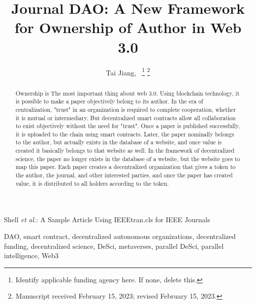 \documentclass[lettersize,journal]{IEEEtran}
\begin{document}
\title{Journal DAO: A New Framework for Ownership of Author in Web 3.0}

\author{Tai Jiang,~
\thanks{Identify applicable funding agency here. If none, delete this.}%
\thanks{Manuscript received February 15, 2023; revised February 15, 2023.}}

%
{Shell \MakeLowercase{\textit{et al.}}: A Sample Article Using IEEEtran.cls for IEEE Journals}


\maketitle

\begin{abstract}
Ownership is The most important thing about web 3.0. Using blockchain technology, it is possible to make a paper objectively belong to its author. In the era of centralization, "trust" in an organization is required to complete cooperation, whether it is mutual or intermediary. But decentralized smart contracts allow all collaboration to exist objectively without the need for "trust". Once a paper is published successfully, it is uploaded to the chain using smart contracts. Later, the paper nominally belongs to the author, but actually exists in the database of a website, and once value is created it basically belongs to that website as well. In the framework of decentralized science, the paper no longer exists in the database of a website, but the website goes to map this paper. Each paper creates a decentralized organization that gives a token to the author, the journal, and other interested parties, and once the paper has created value, it is distributed to all holders according to the token.
\end{abstract}

\begin{IEEEkeywords}
DAO, smart contract, decentralized autonomous organizations, decentralized funding, decentralized science, DeSci, metaverses, parallel DeSci, parallel intelligence, Web3
\end{IEEEkeywords}
\end{document}
